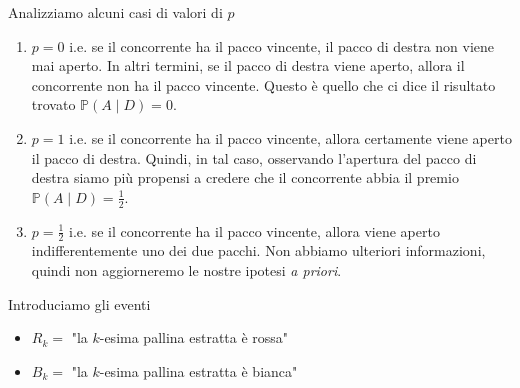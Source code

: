 \begin{enumerate}
Analizziamo alcuni casi di valori di $p$
\begin{enumerate}
\item $\boxed{p=0}$ i.e. se il concorrente ha il pacco vincente, il pacco di destra non viene mai aperto. In altri termini, se il pacco di destra viene aperto, allora il concorrente non ha il pacco vincente. Questo è quello che ci dice il risultato trovato $\mathbb{P}( A\mid D) =0$.
\item $\boxed{p=1}$ i.e. se il concorrente ha il pacco vincente, allora certamente viene aperto il pacco di destra. Quindi, in tal caso, osservando l'apertura del pacco di destra siamo più propensi a credere che il concorrente abbia il premio $\mathbb{P}( A\mid D) =\frac{1}{2}$.
\item $\boxed{p=\frac{1}{2}}$ i.e. se il concorrente ha il pacco vincente, allora viene aperto indifferentemente uno dei due pacchi. Non abbiamo ulteriori informazioni, quindi non aggiorneremo le nostre ipotesi \textit{a priori}.
\end{enumerate}
\end{enumerate}
\Soluzione
\Soluzione
\Soluzione

Introduciamo gli eventi
\begin{itemize}
\item $R_{k} =$ "la $k$-esima pallina estratta è rossa"
\item $B_{k} =$ "la $k$-esima pallina estratta è bianca"
\end{itemize}

